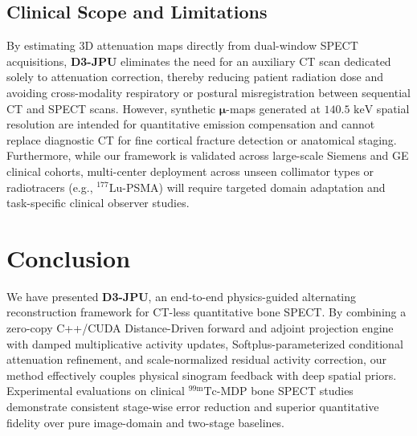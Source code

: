 \documentclass[11pt, a4paper]{article}
\begin{document}
\subsection{Clinical Scope and Limitations}
By estimating 3D attenuation maps directly from dual-window SPECT acquisitions, \textbf{D3-JPU} eliminates the need for an auxiliary CT scan dedicated solely to attenuation correction, thereby reducing patient radiation dose and avoiding cross-modality respiratory or postural misregistration between sequential CT and SPECT scans. However, synthetic $\boldsymbol{\mu}$-maps generated at $140.5\text{ keV}$ spatial resolution are intended for quantitative emission compensation and cannot replace diagnostic CT for fine cortical fracture detection or anatomical staging. Furthermore, while our framework is validated across large-scale Siemens and GE clinical cohorts, multi-center deployment across unseen collimator types or radiotracers (e.g., $^{177}\text{Lu}$-PSMA) will require targeted domain adaptation and task-specific clinical observer studies.

\section{Conclusion}
We have presented \textbf{D3-JPU}, an end-to-end physics-guided alternating reconstruction framework for CT-less quantitative bone SPECT. By combining a zero-copy C++/CUDA Distance-Driven forward and adjoint projection engine with damped multiplicative activity updates, Softplus-parameterized conditional attenuation refinement, and scale-normalized residual activity correction, our method effectively couples physical sinogram feedback with deep spatial priors. Experimental evaluations on clinical $^{99\text{m}}\text{Tc}$-MDP bone SPECT studies demonstrate consistent stage-wise error reduction and superior quantitative fidelity over pure image-domain and two-stage baselines.
\end{document}
